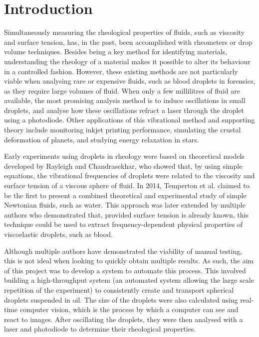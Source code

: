 \documentclass{physics_article_B}
\begin{document}
\newpage
\tableofcontents

\setlength{\parskip}{8pt}  
\newpage
{} 
\setcounter{page}{1}

\section{Introduction\label{sect:intro}}

    Simultaneously measuring the rheological properties of fluids, such as viscosity and surface tension, has, in the past, been accomplished with rheometers\cite{harrold2} or drop volume techniques\cite{miller1992}. Besides being a key method for identifying materials, understanding the rheology of a material makes it possible to alter its behaviour in a controlled fashion. However, these existing methods are not particularly viable when analysing rare or expensive fluids, such as blood droplets in forensics, as they require large volumes of fluid. When only a few millilitres of fluid are available, the most promising analysis method is to induce oscillations in small droplets\cite{harrold}, and analyse how these oscillations refract a laser through the droplet using a photodiode. Other applications of this vibrational method and supporting theory include monitoring inkjet printing performance\cite{Martin2008}, simulating the crustal deformation of planets\cite{vukasinovic}, and studying energy relaxation in stars\cite{vukasinovic}.
    
    Early experiments using droplets in rheology were based on theoretical models developed by Rayleigh\cite{rayleigh} and Chandrasekhar\cite{chandrasekhar2}, who showed that, by using simple equations, the vibrational frequencies of droplets were related to the viscosity and surface tension of a viscous sphere of fluid. In 2014, Temperton et al. claimed to be the first to present a combined theoretical and experimental study of simple Newtonian fluids, such as water\cite{temperton}. This approach was later extended by multiple authors who demonstrated that, provided surface tension is already known, this technique could be used to extract frequency-dependent physical properties of viscoelastic droplets, such as blood\cite{egry}. 
    
    Although multiple authors have demonstrated the viability of manual testing\cite{benmore,Meier2000,Egry1998}, this is not ideal when looking to quickly obtain multiple results. As such, the aim of this project was to develop a system to automate this process. This involved building a high-throughput system (an automated system allowing the large scale repetition of the experiment) to consistently create and transport spherical droplets suspended in oil. The size of the droplets were also calculated using real-time computer vision, which is the process by which a computer can see and react to images. After oscillating the droplets, they were then analysed with a laser and photodiode to determine their rheological properties.
    
\end{document}
